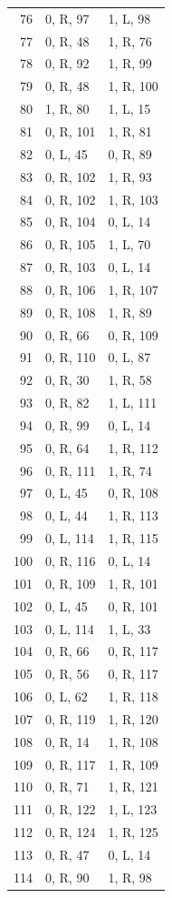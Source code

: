\begin{longtable}{@{}rll@{}}
76 & 0, R, 97 & 1, L, 98\\
77 & 0, R, 48 & 1, R, 76\\
78 & 0, R, 92 & 1, R, 99\\
79 & 0, R, 48 & 1, R, 100\\
80 & 1, R, 80 & 1, L, 15\\
81 & 0, R, 101 & 1, R, 81\\
82 & 0, L, 45 & 0, R, 89\\
83 & 0, R, 102 & 1, R, 93\\
84 & 0, R, 102 & 1, R, 103\\
85 & 0, R, 104 & 0, L, 14\\
86 & 0, R, 105 & 1, L, 70\\
87 & 0, R, 103 & 0, L, 14\\
88 & 0, R, 106 & 1, R, 107\\
89 & 0, R, 108 & 1, R, 89\\
90 & 0, R, 66 & 0, R, 109\\
91 & 0, R, 110 & 0, L, 87\\
92 & 0, R, 30 & 1, R, 58\\
93 & 0, R, 82 & 1, L, 111\\
94 & 0, R, 99 & 0, L, 14\\
95 & 0, R, 64 & 1, R, 112\\
96 & 0, R, 111 & 1, R, 74\\
97 & 0, L, 45 & 0, R, 108\\
98 & 0, L, 44 & 1, R, 113\\
99 & 0, L, 114 & 1, R, 115\\
100 & 0, R, 116 & 0, L, 14\\
101 & 0, R, 109 & 1, R, 101\\
102 & 0, L, 45 & 0, R, 101\\
103 & 0, L, 114 & 1, L, 33\\
104 & 0, R, 66 & 0, R, 117\\
105 & 0, R, 56 & 0, R, 117\\
106 & 0, L, 62 & 1, R, 118\\
107 & 0, R, 119 & 1, R, 120\\
108 & 0, R, 14 & 1, R, 108\\
109 & 0, R, 117 & 1, R, 109\\
110 & 0, R, 71 & 1, R, 121\\
111 & 0, R, 122 & 1, L, 123\\
112 & 0, R, 124 & 1, R, 125\\
113 & 0, R, 47 & 0, L, 14\\
114 & 0, R, 90 & 1, R, 98\\

\end{longtable}
